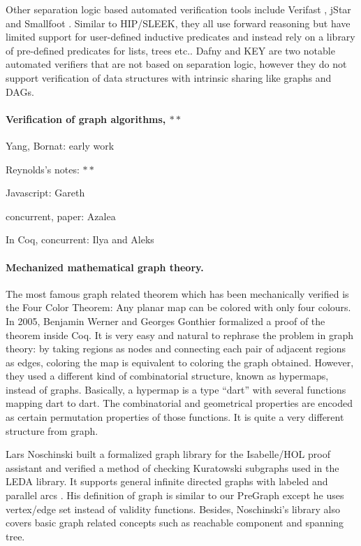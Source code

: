 Other separation logic based automated verification tools include Verifast \cite{jacobs:verifast}, jStar \cite{DistefanoP08} and Smallfoot \cite{berdine:smallfoot}. Similar to HIP/SLEEK, they all use forward reasoning but have limited support for user-defined inductive predicates and instead rely on a library of pre-defined predicates for lists, trees etc.. Dafny \cite{Leino10} and KEY \cite{Beckert:2007} are two notable automated verifiers that are not based on separation logic, however they do not support verification of data structures with intrinsic sharing like graphs and DAGs.

\paragraph{Verification of graph algorithms, $**$}

Yang, Bornat: early work

Reynolds's notes: $**$

Javascript: Gareth

concurrent, paper: Azalea

In Coq, concurrent: Ilya and Aleks

\paragraph{Mechanized mathematical graph theory.}

The most famous graph related theorem which has been mechanically
verified is the Four Color Theorem: Any planar map can be colored with
only four colours. In 2005, Benjamin Werner and Georges Gonthier
formalized a proof of the theorem \cite{gonthier2005computer} inside
Coq. It is very easy and natural to rephrase the problem in graph
theory: by taking regions as nodes and connecting each pair of
adjacent regions as edges, coloring the map is equivalent to coloring
the graph obtained. However, they used a different kind of
combinatorial structure, known as hypermaps, instead of
graphs. Basically, a hypermap is a type ``dart'' with several
functions mapping dart to dart. The combinatorial and geometrical
properties are encoded as certain permutation properties of those
functions. It is quite a very different structure from graph.

Lars Noschinski built a formalized graph library for the Isabelle/HOL
proof assistant and verified a method of checking Kuratowski subgraphs
used in the LEDA library. It supports general infinite directed graphs
with labeled and parallel arcs \cite{Noschinski2015}. His definition
of graph is similar to our PreGraph except he uses vertex/edge set
instead of validity functions. Besides, Noschinski's library also
covers basic graph related concepts such as reachable component and
spanning tree.

